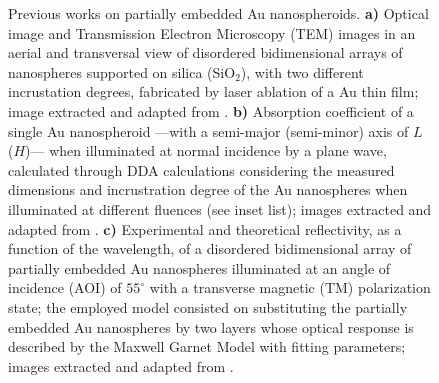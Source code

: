 \begin{figure}[h!]
\centering
\hspace*{-3.75em}%
  \vspace*{-.75em}
  \caption[Backgrounds]{Previous works on partially embedded Au nanospheroids. \textbf{a)} Optical image and Transmission Electron Microscopy (TEM) images in an aerial and transversal view of disordered bidimensional arrays of nanospheres supported on silica  (SiO$_2$),  with two different incrustation degrees, fabricated by laser ablation of a Au thin film; image extracted and adapted from \cite{meng_anisotropic_2015}. \textbf{b) }  Absorption coefficient of a single Au nanospheroid ---with a semi-major (semi-minor) axis of $L$ ($H$)--- when illuminated at normal incidence by a plane wave, calculated through DDA calculations considering the measured dimensions and incrustration degree of the Au nanospheres when illuminated at different fluences (see inset list); images extracted and adapted from \cite{meng_anisotropic_2015}.  \textbf{c)} Experimental and theoretical reflectivity, as a function of the wavelength, of a disordered bidimensional array of partially embedded Au nanospheres illuminated at an angle of incidence (AOI) of $55^\circ$ with a transverse magnetic (TM) polarization state; the employed model consisted on substituting the partially embedded Au nanospheres by two layers whose optical response is described by the Maxwell Garnet Model with fitting parameters; images extracted and adapted from \cite{moirangthem_enhanced_2012}.
   }
\label{fig:IncPapers}
\end{figure}

